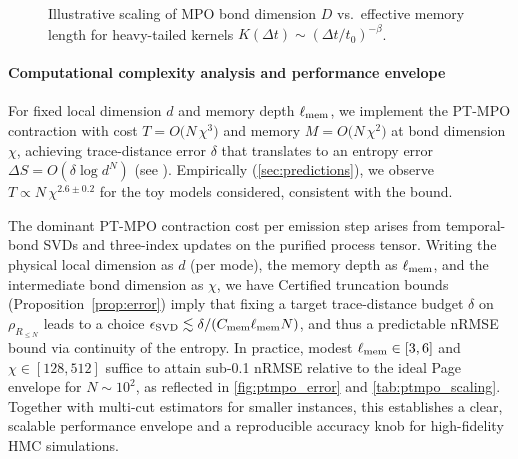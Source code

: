 \documentclass[a4paper,11pt]{article}
\newcommand{\HMC}{\textup{\textsc{HMC}}\xspace}
\theoremstyle{plain}
\theoremstyle{definition}
\theoremstyle{remark}
\begin{document}
\begin{figure}[htbp]
    \centering
    \caption{Illustrative scaling of MPO bond dimension $D$ vs.\ effective memory length for heavy-tailed kernels $K(\Delta t)\sim (\Delta t/t_0)^{-\beta}$.}
    \label{fig:heavy-tail}
    \end{figure}


\paragraph{Computational complexity analysis and performance envelope}
For fixed local dimension $d$ and memory depth $\ell_{\rm mem}$, we implement the PT-MPO contraction with cost $T=O\!\big(N\,\chi^3\big)$ and memory $M=O\!\big(N\,\chi^2\big)$ at bond dimension $\chi$, achieving trace-distance error $\delta$ that translates to an entropy error $\Delta S=O(\delta\log d^N)$ (see ). Empirically (\cref{sec:predictions}), we observe $T\propto N\,\chi^{2.6\pm0.2}$ for the toy models considered, consistent with the bound.

The dominant PT-MPO contraction cost per emission step arises from temporal-bond SVDs and three-index updates on the purified process tensor. Writing the physical local dimension as $d$ (per mode), the memory depth as $\ell_{\rm mem}$, and the intermediate bond dimension as $\chi$, we have
Certified truncation bounds (Proposition~\ref{prop:error}) imply that fixing a target trace-distance budget $\delta$ on $\rho_{R_{\le N}}$ leads to a choice $\epsilon_{\rm SVD}\lesssim \delta/(C_{\rm mem}\ell_{\rm mem} N)$, and thus a predictable nRMSE bound via continuity of the entropy. In practice, modest $\ell_{\rm mem}\in[3,6]$ and $\chi\in[128,512]$ suffice to attain sub-0.1 nRMSE relative to the ideal Page envelope for $N\sim 10^2$, as reflected in \cref{fig:ptmpo_error} and \cref{tab:ptmpo_scaling}. Together with multi-cut estimators for smaller instances, this establishes a clear, scalable performance envelope and a reproducible accuracy knob for high-fidelity \HMC{} simulations.
\end{document}
